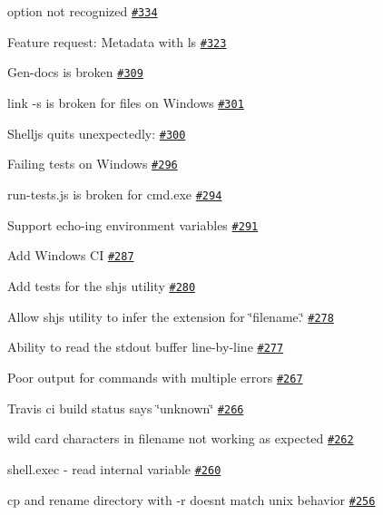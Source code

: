 \begin{DoxyItemize}
\item option not recognized \href{https://github.com/shelljs/shelljs/issues/334}{\tt \#334}
\item Feature request\+: Metadata with {\ttfamily ls} \href{https://github.com/shelljs/shelljs/issues/323}{\tt \#323}
\item Gen-\/docs is broken \href{https://github.com/shelljs/shelljs/issues/309}{\tt \#309}
\item {\ttfamily link -\/s} is broken for files on Windows \href{https://github.com/shelljs/shelljs/issues/301}{\tt \#301}
\item Shelljs quits unexpectedly\+: \href{https://github.com/shelljs/shelljs/issues/300}{\tt \#300}
\item Failing tests on Windows \href{https://github.com/shelljs/shelljs/issues/296}{\tt \#296}
\item run-\/tests.\+js is broken for cmd.\+exe \href{https://github.com/shelljs/shelljs/issues/294}{\tt \#294}
\item Support echo-\/ing environment variables \href{https://github.com/shelljs/shelljs/issues/291}{\tt \#291}
\item Add Windows CI \href{https://github.com/shelljs/shelljs/issues/287}{\tt \#287}
\item Add tests for the shjs utility \href{https://github.com/shelljs/shelljs/issues/280}{\tt \#280}
\item Allow shjs utility to infer the extension for \char`\"{}filename.\char`\"{} \href{https://github.com/shelljs/shelljs/issues/278}{\tt \#278}
\item Ability to read the stdout buffer line-\/by-\/line \href{https://github.com/shelljs/shelljs/issues/277}{\tt \#277}
\item Poor output for commands with multiple errors \href{https://github.com/shelljs/shelljs/issues/267}{\tt \#267}
\item Travis ci build status says \char`\"{}unknown\char`\"{} \href{https://github.com/shelljs/shelljs/issues/266}{\tt \#266}
\item wild card characters in filename not working as expected \href{https://github.com/shelljs/shelljs/issues/262}{\tt \#262}
\item shell.\+exec -\/ read internal variable \href{https://github.com/shelljs/shelljs/issues/260}{\tt \#260}
\item cp and rename directory with -\/r doesn\textquotesingle{}t match unix behavior \href{https://github.com/shelljs/shelljs/issues/256}{\tt \#256}

\end{DoxyItemize}
